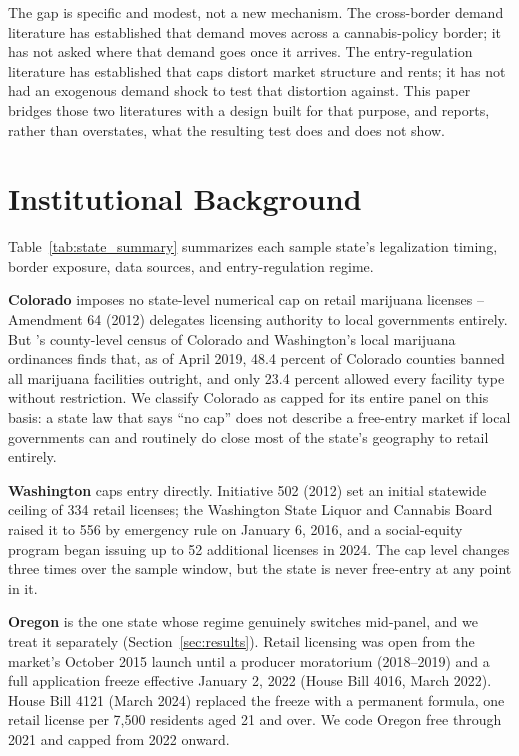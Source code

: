 \documentclass[12pt]{article}
\begin{document}
The gap is specific and modest, not a new mechanism. The cross-border demand literature has established that
demand moves across a cannabis-policy border; it has not asked where that demand goes once it arrives. The
entry-regulation literature has established that caps distort market structure and rents; it has not had an
exogenous demand shock to test that distortion against. This paper bridges those two literatures with a
design built for that purpose, and reports, rather than overstates, what the resulting test does and does not
show.

\section{Institutional Background}
\label{sec:institutional}



Table~\ref{tab:state_summary} summarizes each sample state's legalization timing, border exposure, data
sources, and entry-regulation regime.

\textbf{Colorado} imposes no state-level numerical cap on retail marijuana licenses -- Amendment 64 (2012)
delegates licensing authority to local governments entirely. But \citet{PayanBrownSong2021}'s county-level
census of Colorado and Washington's local marijuana ordinances finds that, as of April 2019, 48.4 percent of
Colorado counties banned all marijuana facilities outright, and only 23.4 percent allowed every facility type
without restriction. We classify Colorado as capped for its entire panel on this basis: a state law that says
``no cap'' does not describe a free-entry market if local governments can and routinely do close most of the
state's geography to retail entirely.

\textbf{Washington} caps entry directly. Initiative 502 (2012) set an initial statewide ceiling of 334 retail
licenses; the Washington State Liquor and Cannabis Board raised it to 556 by emergency rule on January 6, 2016,
and a social-equity program began issuing up to 52 additional licenses in 2024. The cap level changes three
times over the sample window, but the state is never free-entry at any point in it.

\textbf{Oregon} is the one state whose regime genuinely switches mid-panel, and we treat it separately
(Section~\ref{sec:results}). Retail licensing was open from the market's October 2015 launch until a producer
moratorium (2018--2019) and a full application freeze effective January 2, 2022 (House Bill 4016, March 2022).
House Bill 4121 (March 2024) replaced the freeze with a permanent formula, one retail license per 7,500
residents aged 21 and over. We code Oregon free through 2021 and capped from 2022 onward.
\end{document}
